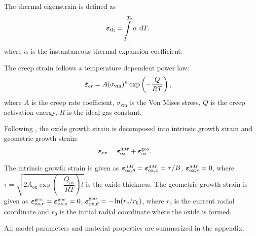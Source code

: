 The thermal eigenstrain is defined as
\begin{align}
  \boldsymbol{\varepsilon}_\text{th} = \int\limits_{T_1}^{T_2} \alpha \text{ d}T,
\end{align}
where $\alpha$ is the instantaneous thermal expansion coefficient.

The creep strain follows a temperature dependent power law:
\begin{align}
  \dot{\boldsymbol{\varepsilon}}_\text{cr} = A(\sigma_\text{vm})^n \exp\left( -\dfrac{Q}{RT} \right),
\end{align}
where $A$ is the creep rate coefficient, $\sigma_\text{vm}$ is the Von Mises stress, $Q$ is the creep activation energy, $R$ is the ideal gas constant.

Following \cite{xue2020stress}, the oxide growth strain is decomposed into intrinsic growth strain and geometric growth strain:
\begin{align}
  \boldsymbol{\varepsilon}_\text{ox} & = \boldsymbol{\varepsilon}_\text{ox}^\text{intr} + \boldsymbol{\varepsilon}_\text{ox}^\text{geo}.
\end{align}

The intrinsic growth strain is given as $\boldsymbol{\varepsilon}_{\text{ox}, \theta}^\text{intr} = \boldsymbol{\varepsilon}_{\text{ox}, z}^\text{intr} = \tau/B$, $\boldsymbol{\varepsilon}_{\text{ox}, r}^\text{intr} = 0$, where $\tau = \sqrt{2A_\text{ox}\exp(-\dfrac{Q_\text{ox}}{RT})t}$ is the oxide thickness.
The geometric growth strain is given as $\boldsymbol{\varepsilon}_{\text{ox}, r}^\text{geo} = \boldsymbol{\varepsilon}_{\text{ox}, z}^\text{geo} = 0$, $\boldsymbol{\varepsilon}_{\text{ox}, \theta}^\text{geo} = -\ln(r_c/r_0)$, where $r_c$ is the current radial coordinate and $r_0$ is the initial radial coordinate where the oxide is formed.

All model parameters and material properties are summarized in the appendix.

